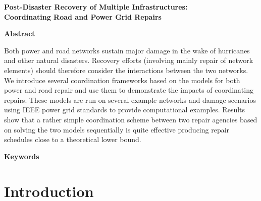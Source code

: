 \documentclass[10pt]{article}
\begin{document}
\newpage
\thispagestyle{empty}
\begin{center}
{\Large \textbf{Post-Disaster Recovery of Multiple Infrastructures: \\ Coordinating Road and Power Grid Repairs}} \\
\vspace*{0.2cm}
\end{center}

\thispagestyle{empty}
\begin{center}
{\large \bf Abstract}
\end{center}
Both power and road networks sustain major damage in the wake of hurricanes and other natural disasters. Recovery efforts (involving mainly repair of network elements)  should therefore consider the interactions between the two networks. We introduce several coordination frameworks based on the models for both power and road repair and use them to demonstrate the impacts of coordinating repairs. These models are run on several example networks and damage scenarios using IEEE power grid standards to provide computational examples. Results show that a rather simple coordination scheme between two repair agencies based on solving the two models sequentially is quite effective producing repair schedules close to a theoretical lower bound.


{\large \bf Keywords}\\
\vspace*{-12pt}

\vspace*{-12pt}
\section{{\large Introduction}}
\label{sec:ic:intro}
\vspace*{-12pt}
\end{document}
